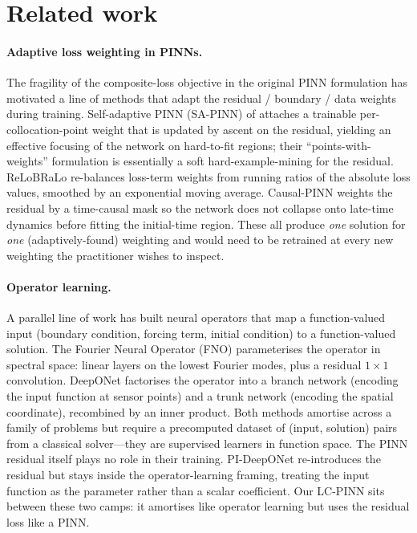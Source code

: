 \section{Related work}
\label{sec:related}

\paragraph{Adaptive loss weighting in PINNs.}
The fragility of the composite-loss objective in the original PINN
formulation \citep{raissi2019} has motivated a line of methods that
adapt the residual / boundary / data weights during training.
Self-adaptive PINN (SA-PINN) of \citet{mcclenny2020} attaches a
trainable per-collocation-point weight that is updated by ascent on
the residual, yielding an effective focusing of the network on
hard-to-fit regions; their ``points-with-weights'' formulation is
essentially a soft hard-example-mining for the residual. ReLoBRaLo
\citep{bischof2021} re-balances loss-term weights from running
ratios of the absolute loss values, smoothed by an exponential moving
average. Causal-PINN \citep{wang2024} weights the residual by a
time-causal mask so the network does not collapse onto late-time
dynamics before fitting the initial-time region. These all produce
\emph{one} solution for \emph{one} (adaptively-found) weighting and
would need to be retrained at every new weighting the practitioner
wishes to inspect.

\paragraph{Operator learning.}
A parallel line of work has built neural operators that map a
function-valued input (boundary condition, forcing term, initial
condition) to a function-valued solution. The Fourier Neural Operator
(FNO) \citep{li2020fno} parameterises the operator in spectral space:
linear layers on the lowest Fourier modes, plus a residual
$1\!\times\!1$ convolution. DeepONet \citep{lu2021deeponet} factorises
the operator into a branch network (encoding the input function at
sensor points) and a trunk network (encoding the spatial coordinate),
recombined by an inner product. Both methods amortise across a family
of problems but require a precomputed dataset of (input, solution)
pairs from a classical solver---they are supervised learners in
function space. The PINN residual itself plays no role in their
training. PI-DeepONet \citep{wang2021pi-deeponet} re-introduces the
residual but stays inside the operator-learning framing, treating the
input function as the parameter rather than a scalar coefficient.
Our LC-PINN sits between these two camps: it amortises like
operator learning but uses the residual loss like a PINN.

